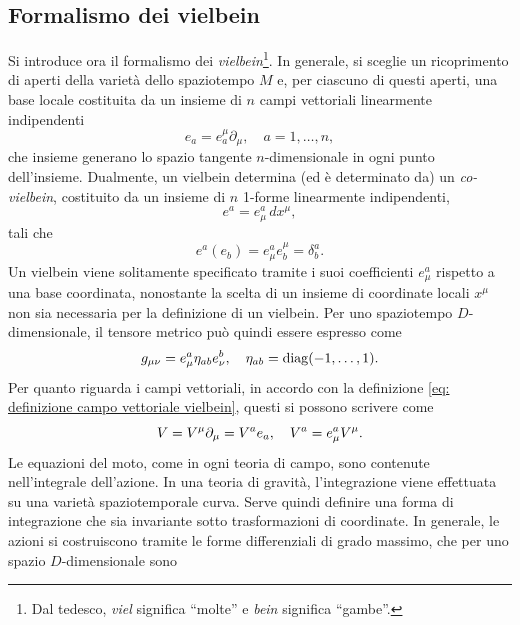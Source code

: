 \subsection{Formalismo dei vielbein} 
Si introduce ora il formalismo dei \emph{vielbein}\footnote{Dal tedesco, \emph{viel} significa ``molte'' e \emph{bein} significa ``gambe''.}. In generale, si sceglie un ricoprimento di aperti della varietà dello spaziotempo $M$ e, per ciascuno di questi aperti, una base locale costituita da un insieme di $n$ campi vettoriali linearmente indipendenti 
\begin{equation}
\label{eq: definizione campo vettoriale vielbein}
    e_a = e_a^\mu \partial_\mu,\quad a = 1,\ldots,n,
\end{equation}
che insieme generano lo spazio tangente $n$-dimensionale in ogni punto dell'insieme. Dualmente, un vielbein determina (ed è determinato da) un \emph{co-vielbein}, costituito da un insieme di $n$ 1-forme linearmente indipendenti,
\begin{equation}
\label{eq: definizione 1-forma vielbein}
    e^a = e^a_\mu \, dx^\mu,
\end{equation}
tali che
\begin{equation}
    e^a(e_b) = e^a_\mu e_b^\mu = \delta^a_b.
\end{equation}
Un vielbein viene solitamente specificato tramite i suoi coefficienti $e^a_\mu$ rispetto a una base coordinata, nonostante la scelta di un insieme di coordinate locali $x^\mu$ non sia necessaria per la definizione di un vielbein. Per uno spaziotempo $D$-dimensionale, il tensore metrico può quindi essere espresso come
\begin{equation}
    g_{\mu\nu} = e^a_\mu\eta_{ab}e^b_\nu,\quad \eta_{ab} = \mathrm{diag}{(-1,\dots,1)}.
\end{equation}
Per quanto riguarda i campi vettoriali, in accordo con la definizione \eqref{eq: definizione campo vettoriale vielbein}, questi si possono scrivere come
\begin{equation}
    V = V^\mu\partial_\mu = V^a e_a,\quad V^a = e^a_\mu V^\mu.
\end{equation}
Le equazioni del moto, come in ogni teoria di campo, sono contenute nell'integrale dell'azione. In una teoria di gravità, l'integrazione viene effettuata su una varietà spaziotemporale curva. Serve quindi definire una forma di integrazione che sia invariante sotto trasformazioni di coordinate. In generale, le azioni si costruiscono tramite le forme differenziali di grado massimo, che per uno spazio $D$-dimensionale sono 
